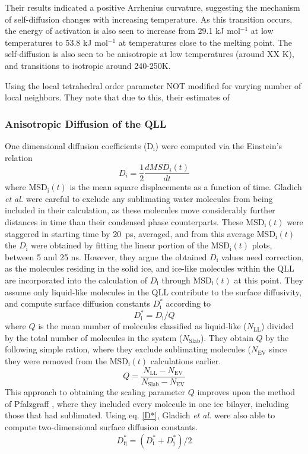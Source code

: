 Their results indicated a positive Arrhenius curvature, suggesting the
mechanism of self-diffusion changes with increasing temperature. As
this transition occurs, the energy of activation is also seen to
increase from 29.1 kJ mol$^{-1}$ at low temperatures to 53.8 kJ
mol$^{-1}$ at temperatures close to the melting point. The
self-diffusion is also seen to be anisotropic at low temperatures
(around XX K), and transitions to isotropic around 240-250K. 

Using the local tetrahedral order parameter NOT modified for varying
number of local neighbors. They note that due to this, their estimates
of 

\subsubsection{Anisotropic Diffusion of the QLL}
One dimensional diffusion coefficients (D$_\mathrm{i}$) were computed
via the Einstein's relation\cite{Allen1987}
\begin{equation}
D_{i} = \frac{1}{2} \frac{dMSD_{i}(t)}{dt}
\end{equation}
where MSD$_\mathrm{i}(t)$ is the mean square displacements as a
function of time. Gladich \textit{et al.} were careful to exclude any
sublimating water molecules from being included in their calculation,
as these molecules move considerably further distances in time than
their condensed phase counterparts. These MSD$_\mathrm{i}(t)$ were
staggered in starting time by 20~ps, averaged, and from this average
MSD$_\mathrm{i}(t)$ the $D_\mathrm{i}$ were obtained by fitting the
linear portion of the MSD$_\mathrm{i}(t)$ plots, between 5 and 25
ns. However, they argue the obtained $D_\mathrm{i}$ values need
correction, as the molecules residing in the solid ice, and ice-like
molecules within the QLL are incorporated into the calculation of
$D_\mathrm{i}$ through MSD$_\mathrm{i}(t)$ at this point. They assume
only liquid-like molecules in the QLL contribute to the surface
diffusivity, and compute surface diffusion constants
$D^{*}_\mathrm{i}$ according to\cite{Pfalzgraff2011}
\begin{equation}\label{D*}
D^{*}_\mathrm{i} = D_\mathrm{i}/Q
\end{equation}
where $Q$ is the mean number of molecules classified as liquid-like
($N_\mathrm{LL}$) divided by the total number of molecules in the
system ($N_\mathrm{Slab}$). They obtain $Q$ by the following simple
ration, where they exclude sublimating molecules ($N_\mathrm{EV}$
since they were removed from the MSD$_\mathrm{i}(t)$ calculations
earlier.
\begin{equation}
Q = \frac{N_\mathrm{LL} - N_\mathrm{EV}}{N_\mathrm{Slab} -
  N_\mathrm{EV}}
\end{equation}
This approach to obtaining the scaling parameter $Q$ improves upon the
method of Pfalzgraff \cite{Pfalzgraff2011}, where they included every
molecule in one ice bilayer, including those that had
sublimated. Using eq. \eqref{D*}, Gladich \textit{et al.} were also
able to compute two-dimensional surface diffusion constants.
\begin{equation}
D^{*}_\mathrm{ij} = (D^{*}_\mathrm{i} + D^{*}_\mathrm{j}) / 2
\end{equation} 

